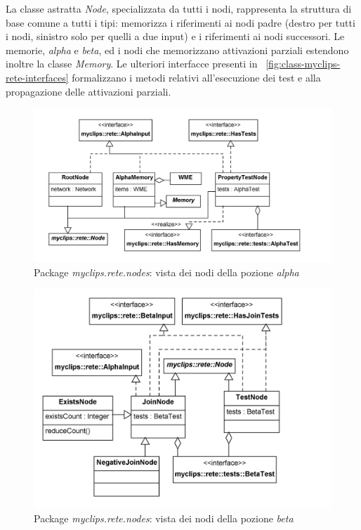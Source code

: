 La classe astratta \emph{Node}, specializzata da tutti i nodi, rappresenta la struttura di base comune a tutti i tipi: memorizza i riferimenti ai nodi padre (destro per tutti i nodi, sinistro solo per quelli a due input) e i riferimenti ai nodi successori. Le memorie, \emph{alpha} e \emph{beta}, ed i nodi che memorizzano attivazioni parziali estendono inoltre la classe \emph{Memory}. Le ulteriori interfacce presenti in \figurename~\ref{fig:class-myclips-rete-interfaces} formalizzano i metodi relativi all'esecuzione dei test e alla propagazione delle attivazioni parziali.

\begin{figure}
\centering
\includegraphics[width=1\textwidth]{Immagini/Capitolo3/Classi/myclips_rete_nodes_Nodi-Alpha.png}
\caption{Package \emph{myclips.rete.nodes}: vista dei nodi della pozione \emph{alpha}}\label{fig:class-myclips-rete-nodes-alpha}
\end{figure}

\begin{figure}
\centering
\includegraphics[width=1\textwidth]{Immagini/Capitolo3/Classi/myclips_rete_nodes_Join-Tests-Exists-Negative-Nodes.png}
\caption{Package \emph{myclips.rete.nodes}: vista dei nodi della pozione \emph{beta}}\label{fig:class-myclips-rete-nodes-beta}
\end{figure}

